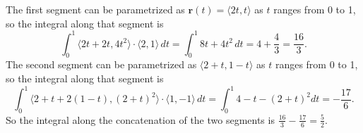 \documentclass[asy,breakable]{worksheet}
\begin{document}
\solfinalanswer

\begin{solution} 
  The first segment can be parametrized as $\mathbf{r}(t) = \langle
  2t,t \rangle$ as
  $t$ ranges from 0 to 1, so the integral along that segment is
  \[
    \int_0^1 \langle 2t + 2t, 4t^2 \rangle \cdot \langle 2, 1 \rangle
    \, dt  = \int_0^1 8t + 4t^2 \, dt = 4 + \frac{4}{3} =
    \frac{16}{3}. 
  \]
  The second segment can be parametrized as $\langle 2 + t, 1- t
  \rangle$ as $t$ ranges from 0 to 1, so the integral along that
  segment is
    \[
    \int_0^1 \langle 2+t + 2(1-t), (2+t)^2\rangle \cdot \langle 1, -1 \rangle
    \, dt  = \int_0^1 4-t - (2+t)^2 dt = -\frac{17}{6}. 
  \]
  So the integral along the concatenation of the two segments is
  $\displaystyle{\frac{16}{3} - \frac{17}{6} }= \frac{5}{2}$. 

\end{solution}
\end{document}
